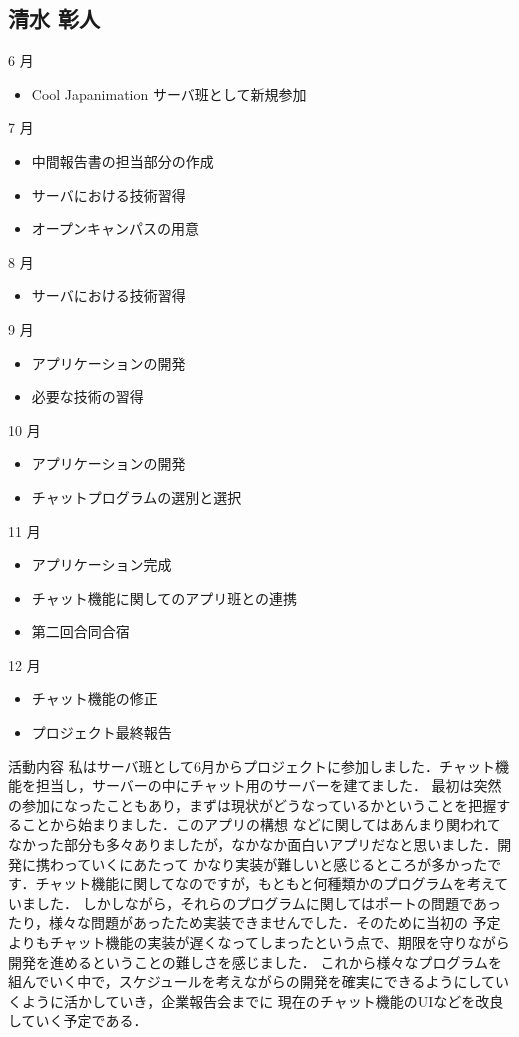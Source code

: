 \subsection{清水 彰人}
6 月
\begin{itemize}
\item Cool Japanimation サーバ班として新規参加
\end{itemize}
7 月
\begin{itemize}
\item 中間報告書の担当部分の作成
\item サーバにおける技術習得
\item オープンキャンパスの用意
\end{itemize}
8 月
\begin{itemize}
\item サーバにおける技術習得
\end{itemize}
9 月
\begin{itemize}
\item アプリケーションの開発
\item 必要な技術の習得
\end{itemize}
10 月
\begin{itemize}
\item アプリケーションの開発
\item チャットプログラムの選別と選択
\end{itemize}
11 月
\begin{itemize}
\item アプリケーション完成
\item チャット機能に関してのアプリ班との連携
\item 第二回合同合宿
\end{itemize}
12 月
\begin{itemize}
\item チャット機能の修正
\item プロジェクト最終報告
\end{itemize}
\par
活動内容
  私はサーバ班として6月からプロジェクトに参加しました．チャット機能を担当し，サーバーの中にチャット用のサーバーを建てました．
  最初は突然の参加になったこともあり，まずは現状がどうなっているかということを把握することから始まりました．このアプリの構想
  などに関してはあんまり関われてなかった部分も多々ありましたが，なかなか面白いアプリだなと思いました．開発に携わっていくにあたって
  かなり実装が難しいと感じるところが多かったです．チャット機能に関してなのですが，もともと何種類かのプログラムを考えていました．
  しかしながら，それらのプログラムに関してはポートの問題であったり，様々な問題があったため実装できませんでした．そのために当初の
  予定よりもチャット機能の実装が遅くなってしまったという点で、期限を守りながら開発を進めるということの難しさを感じました．
  これから様々なプログラムを組んでいく中で，スケジュールを考えながらの開発を確実にできるようにしていくように活かしていき，企業報告会までに
  現在のチャット機能のUIなどを改良していく予定である．
  
  
